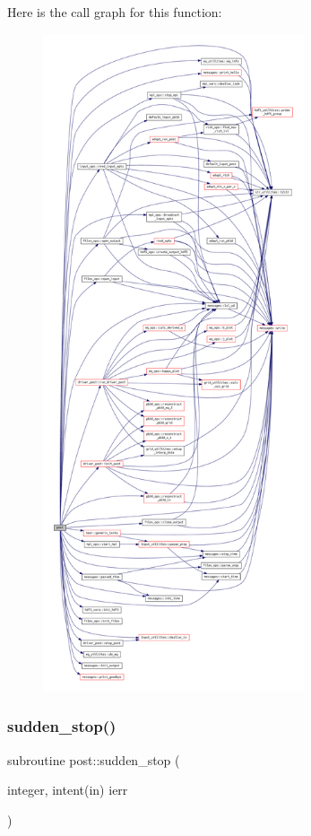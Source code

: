 Here is the call graph for this function\+:
\nopagebreak
\begin{figure}[H]
\begin{center}
\leavevmode
\includegraphics[height=550pt]{POST_8f90_ac289b64ac4671fea0b4f2298ba1188a1_cgraph}
\end{center}
\end{figure}
\mbox{\label{POST_8f90_aaee67c546b34b4095587a626df7b98c2}} 
\subsubsection{\texorpdfstring{sudden\+\_\+stop()}{sudden\_stop()}}
{\footnotesize\ttfamily subroutine post\+::sudden\+\_\+stop (\begin{DoxyParamCaption}\item[{integer, intent(in)}]{ierr }\end{DoxyParamCaption})}



